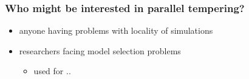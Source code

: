 \begin{frame}
		\frametitle{Who might be interested in parallel tempering? }
	
	\begin{itemize}
		\item anyone having problems with locality of simulations
		
		\item researchers facing model selection problems 
	 
		\begin{itemize}
			\item used for ..
		\end{itemize}

	\end{itemize}	

\end{frame}	

